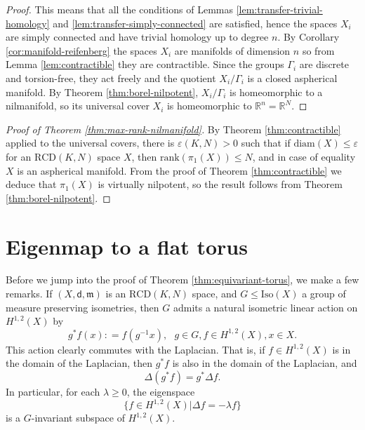 \documentclass[12pt]{amsart}
\theoremstyle{definition}
\numberwithin{equation}{section}
\newcommand{\rank}{{\text{rank}}}
\newcommand{\diam}{{\text {diam}}}
\newcommand{\iso}{\text{Iso}}
\newcommand{\sobo}{H^{1,2}}
\newcommand{\rcd}{\text{RCD}}
\newcommand{\mm}{\mathfrak{m}}
\begin{document}
\begin{proof}
This means that all the conditions of Lemmas \ref{lem:transfer-trivial-homology} and  \ref{lem:transfer-simply-connected} are satisfied, hence the spaces $X_i$ are simply connected and have trivial homology up to degree $n$. By Corollary \ref{cor:manifold-reifenberg} the spaces $X_i$ are manifolds of dimension $n$ so from Lemma \ref{lem:contractible} they are contractible. Since the groups $\Gamma _i$ are discrete and torsion-free, they act freely and the quotient $X_i / \Gamma _ i $ is a closed aspherical manifold. By Theorem \ref{thm:borel-nilpotent}, $X_i / \Gamma _ i $ is homeomorphic to a nilmanifold, so its universal cover $X_i$ is homeomorphic to $\mathbb{R}^n= \mathbb{R}^N$.
\end{proof}
\begin{proof}[Proof of Theorem \ref{thm:max-rank-nilmanifold}]
    By Theorem \ref{thm:contractible} applied to the universal covers, there is $\varepsilon (K,N) > 0$ such that if $\diam (X) \leq \varepsilon $ for an $\rcd (K,N)$ space $X$, then $\rank (\pi_1(X)) \leq N$, and in case of equality $X$ is an aspherical manifold. From the proof of Theorem \ref{thm:contractible} we deduce that $\pi_1(X)$ is virtually nilpotent, so the result follows from Theorem \ref{thm:borel-nilpotent}. 
\end{proof}


\section{Eigenmap to a flat torus}\label{sec:canonical} 




Before we jump into the proof of Theorem \ref{thm:equivariant-torus}, we make a few remarks. If $(X,\mathsf{d}, \mm )$ is an $\rcd (K,N)$ space, and $G \leq \iso (X)$ a group of measure preserving isometries, then $G$ admits a natural isometric linear action on $\sobo (X)$ by 
\[   g^{\ast} f (x) : = f (g ^{-1} x ) , \, \,\,\, g \in G , f \in \sobo (X), x \in X .    \]
This action clearly commutes with the Laplacian. That is, if  $f \in \sobo (X)$ is in the domain of the Laplacian, then $g^{\ast}f $ is also in the domain of the Laplacian, and
\begin{equation*}%
    \Delta (g^{\ast} f) = g^{\ast} \Delta f  .    
\end{equation*}
In particular, for each $\lambda \geq 0$, the eigenspace
\[     \{  f \in \sobo (X) \vert \Delta f = - \lambda f  \}    \]
is a $G$-invariant subspace of $\sobo (X)$. 
\end{document}
